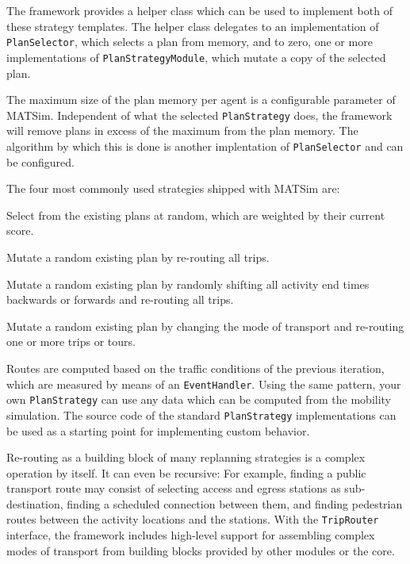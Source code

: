 The framework provides a helper class which can be used to implement both of these strategy templates. 
The helper class delegates to an implementation of \lstinline$PlanSelector$, which selects a plan from memory, 
and to zero, one or more implementations of \lstinline$PlanStrategyModule$, which mutate a copy of the selected plan.

The maximum size of the plan memory per agent is a configurable parameter of MATSim. Independent
 of what the selected \lstinline$PlanStrategy$ does, the framework will remove plans in excess
 of the maximum from the plan memory. The algorithm by which this is done is another implentation
 of \lstinline$PlanSelector$ and can be configured. 

The four most commonly used strategies shipped with MATSim are:

\begin{compactitem}
\item Select from the existing plans at random, which are weighted by their current score.
\item Mutate a random existing plan by re-routing all trips.
\item Mutate a random existing plan by randomly shifting all activity end times backwards or forwards and re-routing 
all trips.
\item Mutate a random existing plan by changing the mode of transport and re-routing one or more trips or tours.
\end{compactitem}

Routes are computed based on the traffic conditions of the previous iteration, which are measured
by means of an \lstinline$EventHandler$. Using the same pattern, your own \lstinline$PlanStrategy$ can use any data which
can be computed from the mobility simulation. The source code of the standard \lstinline$PlanStrategy$ implementations can be 
used as a starting point for implementing custom behavior.

Re-routing as a building block of many replanning strategies is a complex operation by itself. It can
even be recursive: For example, finding a public transport route may consist of selecting access and egress stations as
sub-destination, finding a scheduled connection between them, and finding pedestrian routes between the
activity locations and the stations. With the \lstinline$TripRouter$ interface, the framework includes high-level 
support for assembling complex modes of transport from building blocks provided by other modules or the core. 
  

